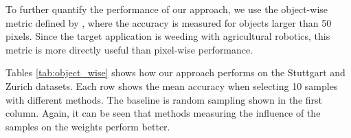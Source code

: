 \documentclass[letterpaper, 10 pt, conference]{ieeeconf}  %
\begin{document}
    
    
To further quantify the performance of our approach, we use the object-wise metric defined by \cite{milioto2018real}, where the accuracy is measured for objects larger than 50 pixels. Since the target application is weeding with agricultural robotics, this metric is more directly useful than pixel-wise performance.  


Tables \ref{tab:object_wise} shows how our approach performs on the Stuttgart and Zurich datasets. Each row shows the mean accuracy when selecting 10 samples with different methods. The baseline is random sampling shown in the first column. Again, it can be seen that methods measuring the influence of the samples on the weights perform better.




%
%
%
\end{document}
